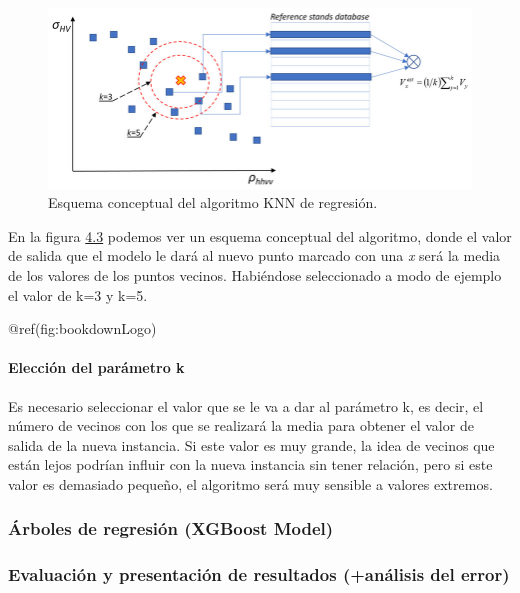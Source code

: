 \documentclass[12pt,a4paper,]{book}
\let\oldparagraph\paragraph
\renewcommand{\paragraph}[1]{\oldparagraph{#1}\mbox{}}
\numberwithin{dummy}{section}
\theoremstyle{ocrenumbox}
\theoremstyle{blacknumex}
\theoremstyle{blacknumbox}
\theoremstyle{ocrenum}
\theoremstyle{ocrenum}
\begin{document}
\begin{figure}[H]

{\centering \includegraphics[width=0.95\linewidth]{graficos/knn_regression} 

}

\caption{Esquema conceptual del algoritmo KNN de regresión.}\label{fig:knn_esq}
\end{figure}

En la figura \protect\hyperlink{knn_esq}{4.3} podemos ver un esquema
conceptual del algoritmo, donde el valor de salida que el modelo le dará
al nuevo punto marcado con una \emph{x} será la media de los valores de
los puntos vecinos. Habiéndose seleccionado a modo de ejemplo el valor
de k=3 y k=5.

@ref(fig:bookdownLogo)

\hypertarget{elecciuxf3n-del-paruxe1metro-k}{%
\paragraph{Elección del parámetro
k}\label{elecciuxf3n-del-paruxe1metro-k}}

Es necesario seleccionar el valor que se le va a dar al parámetro k, es
decir, el número de vecinos con los que se realizará la media para
obtener el valor de salida de la nueva instancia. Si este valor es muy
grande, la idea de vecinos que están lejos podrían influir con la nueva
instancia sin tener relación, pero si este valor es demasiado pequeño,
el algoritmo será muy sensible a valores extremos.

\hypertarget{uxe1rboles-de-regresiuxf3n-xgboost-model}{%
\subsubsection{Árboles de regresión (XGBoost
Model)}\label{uxe1rboles-de-regresiuxf3n-xgboost-model}}

\hypertarget{evaluaciuxf3n-y-presentaciuxf3n-de-resultados-anuxe1lisis-del-error}{%
\subsubsection{Evaluación y presentación de resultados (+análisis del
error)}\label{evaluaciuxf3n-y-presentaciuxf3n-de-resultados-anuxe1lisis-del-error}}
\end{document}
